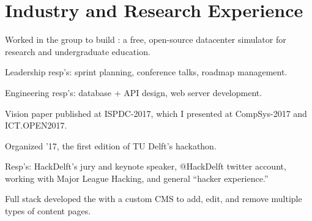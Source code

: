 \documentclass[]{deedy-resume-openfont}
\begin{document}
\begin{minipage}[t]{0.66\textwidth} 


\section{Industry and Research Experience}

\vspace{\topsep}
\begin{tightemize}
    \item Worked in the \href{https://atlarge-research.com/}{} group to build \href{https://opendc.ewi.tudelft.nl/}{}: a free, open-source datacenter simulator for research and undergraduate education.
    \item Leadership resp's: sprint planning, conference talks, roadmap management.
    \item Engineering resp's: database + API design, web server development.
    \item Vision paper published at ISPDC-2017, which I presented at CompSys-2017 and ICT.OPEN2017.
\end{tightemize}
\vspace{0.5\topsep}

\begin{tightemize}
    \item Organized \href{https://hackdelft.com/}{} '17, the first edition of TU Delft's hackathon.
    \item Resp's: HackDelft’s jury and keynote speaker, @HackDelft twitter account, working with Major League Hacking, and general ``hacker experience.''
\end{tightemize}
\vspace{0.5\topsep}

\begin{tightemize}
    \item Full stack developed the \href{http://mugsy.tv/}{} with a custom CMS to add, edit, and remove multiple types of content pages.
\end{tightemize}
\vspace{0.5\topsep}


\end{minipage}
\end{document}
